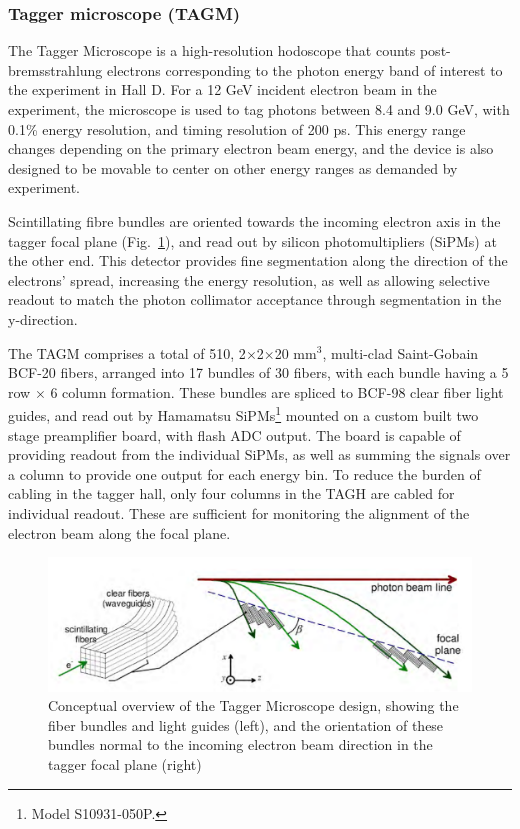 \subsubsection{Tagger microscope (TAGM)}\label{sec:TAGM}
The Tagger Microscope is a high-resolution hodoscope that counts post-bremsstrahlung electrons corresponding to the photon energy band of interest to the experiment in Hall D.
For a 12 GeV incident electron beam in the \GX{} experiment, the microscope is used to tag photons between 8.4 and 9.0 GeV, with 0.1\% energy resolution, and timing resolution of 200 ps.
This energy range changes depending on the primary electron beam energy, and the device is also designed to be movable to center on other energy ranges as demanded by experiment.

Scintillating fibre bundles are oriented towards the incoming electron axis in the tagger focal plane (Fig.~\ref{fig:TAGM_conceptual}), and read out by silicon photomultipliers (SiPMs) at the other end.
This detector provides fine segmentation along the direction of the electrons' spread, increasing the energy resolution, as well as allowing selective readout to match the photon collimator acceptance through segmentation in the y-direction.

The TAGM comprises a total of 510, 2$\times$2$\times$20 mm$^3$, multi-clad Saint-Gobain BCF-20 fibers, arranged into 17 bundles of 30 fibers, with each bundle having a 5 row $\times$ 6 column formation. These bundles are spliced to BCF-98 clear fiber light guides, and read out by Hamamatsu SiPMs\footnote{Model S10931-050P.} mounted on a custom built two stage preamplifier board, with flash ADC output.
The board is capable of providing readout from the individual SiPMs, as well as summing the signals over a column to provide one output for each energy bin.
To reduce the burden of cabling in the tagger hall, only four columns in the TAGH are cabled for individual readout.
These are sufficient for monitoring the alignment of the electron beam along the focal plane.

\begin{figure}[tbh]
\begin{center}
 \includegraphics[clip=true,width=0.95\linewidth]{figures/TAGM_conceptual.pdf}
\end{center}
\caption{Conceptual overview of the Tagger Microscope design, showing the fiber bundles and light guides (left), and the orientation of these bundles normal to the incoming electron beam direction in the tagger focal plane (right)
        }
\label{fig:TAGM_conceptual} 
\end{figure}

